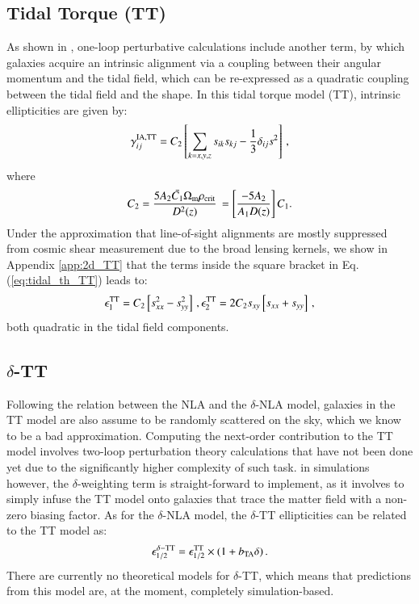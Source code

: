 \documentclass[useAMS,usenatbib]{mn2e}
\begin{document}
\subsection{Tidal Torque (TT)}
\label{subsec:IA_th_TT}

As shown in \citet{Blazek2019}, one-loop perturbative calculations include another term, by which galaxies acquire an intrinsic alignment via a coupling between their angular momentum and the tidal field, which can be re-expressed as a quadratic coupling between the tidal field and the shape. In this tidal torque model (TT), intrinsic ellipticities are given by:
\begin{eqnarray}
\gamma_{ij}^{\rm IA, TT} = C_2 \left[ \sum_{k=x,y,z} s_{ik} s_{kj} -\frac{1}{3} \delta_{ij} s^2 \right] \, ,
\label{eq:tidal_th_TT}
\end{eqnarray}
where 
\begin{eqnarray}
C_2 = \frac{5 A_2 \bar{C_1} \Omega_{\rm m} \rho_{\rm crit}}{D^2(z)} \,  = \left[ \frac{-5 A_2}{A_1 D(z)} \right] C_1.
\end{eqnarray}
Under the approximation that line-of-sight alignments are mostly suppressed from cosmic shear measurement due to the broad lensing kernels, 
we show in  Appendix \ref{app:2d_TT} that the terms inside the square bracket in Eq. (\ref{eq:tidal_th_TT}) leads to:
\begin{eqnarray}
\epsilon_1^{\rm TT} = C_2  \left[ s_{xx}^2 - s_{yy}^2\right] \, , \epsilon_2^{\rm TT} = 2 C_2 s_{xy}\left[s_{xx}+s_{yy}  \right]\, ,
\end{eqnarray}
both quadratic in the tidal field components.


\subsection{$\delta$-TT}
\label{subsec:IA_th_TT}

Following the relation between the NLA and the $\delta$-NLA model, galaxies in the TT model are also assume to be randomly scattered on the sky, which we know to be a bad approximation. Computing the next-order contribution to the TT model involves two-loop perturbation theory calculations that have not been done yet due to the significantly higher complexity of such task. in simulations however, the $\delta$-weighting term is straight-forward to implement, as it involves to simply infuse the TT model onto galaxies that trace the matter field with a non-zero biasing factor. As for the $\delta$-NLA model, the $\delta$-TT ellipticities can  be related to the TT model as:
\begin{eqnarray}
\epsilon_{1/2}^{\delta-\rm TT} = \epsilon_{1/2}^{\rm TT}\times(1 + b_{\rm TA}\delta) \, .
\label{eq:tidal_th_deltaTT}
\end{eqnarray}
 There are currently no theoretical models for $\delta$-TT, which means that predictions from this model are, at the moment, completely simulation-based. 
 
\end{document}
